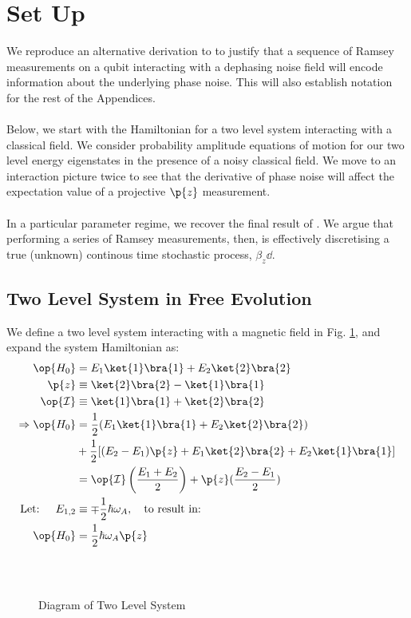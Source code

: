 \section{Set Up}\label{ap:ap_setup}
 We reproduce an alternative derivation to \cite{soare} to justify that a sequence of Ramsey measurements on a qubit interacting with a dephasing noise field will encode information about the underlying phase noise. This will also establish notation for the rest of the Appendices. 
 \\
 \\
Below, we start with the Hamiltonian for a two level system interacting with a classical field. We consider probability amplitude equations of motion for our two level energy eigenstates in the presence of a noisy classical field. We move to an interaction picture twice to see that the derivative of phase noise will affect the expectation value of a projective $\p{z}$ measurement. 
\\
\\
In a particular parameter regime, we recover the final result of \cite{soare}. We argue that performing a series of Ramsey measurements, then, is effectively discretising a true (unknown) continous time stochastic process, $\beta_z \dd $.

\subsection{Two Level System in Free Evolution}

We define a two level system interacting with a magnetic field in Fig. \ref{fig:set_up}, and expand the system Hamiltonian as: 
\\
\begin{align}
\op{H_0} &= E_1\ket{1}\bra{1} + E_2\ket{2}\bra{2} \\
\p{z} &\equiv \ket{2}\bra{2} - \ket{1}\bra{1} \\
\op{\mathcal{I}} & \equiv \ket{1}\bra{1} + \ket{2}\bra{2} \\
\Rightarrow \op{H_0} & = \frac{1}{2} (E_1\ket{1}\bra{1}+ E_2\ket{2}\bra{2}) \\
& + \frac{1}{2} [(E_2 - E_1)\p{z} + E_1 \ket{2}\bra{2} + E_2 \ket{1}\bra{1}]\\
& = \op{\mathcal{I}} \left( \frac{E_1 + E_2}{2} \right) + \p{z}(\frac{E_2 - E_1}{2}) \\
\text{Let: } \quad E_{1,2} &\equiv \mp \frac{1}{2} \hbar \omega_A, \quad \text{to result in:} \\
\op{H_0} &= \frac{1}{2} \hbar \omega_A \p{z}
\end{align}
\\
\\
\begin{figure}[h]
	\centering
	\caption[Setup: Diagram of Two Level System]{Diagram of Two Level System}
	\label{fig:set_up}
\end{figure}
\\
\\
